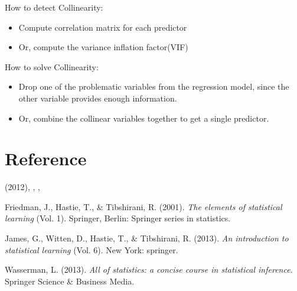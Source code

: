     \documentclass[12pt,fleqn,a4paper]{article}%
\theoremstyle{definition}
\theoremstyle{plain}
\numberwithin{equation}{section}
\begin{document}
How to detect Collinearity:
\begin{itemize}
\item Compute correlation matrix for each predictor
\item Or, compute the variance inflation factor(VIF)
\end{itemize}

How to solve Collinearity:
\begin{itemize}
\item Drop one of the problematic variables from the regression model, since the other variable provides enough information.
\item Or, combine the collinear variables together to get a single predictor.
\end{itemize}

\section*{Reference}
\noindent
\begin{description}\itemsep=-2pt
\item {\MbQ{}} (2012), {\MaQ{}}{\MbQ{}}, {\McQ{}}, {\MkQ{}}
\item Friedman, J., Hastie, T., \& Tibshirani, R. (2001). {\it{The elements of statistical learning}} (Vol. 1). Springer, Berlin: Springer series in statistics.
\item James, G., Witten, D., Hastie, T., \& Tibshirani, R. (2013). {\it{An introduction to statistical learning}} (Vol. 6). New York: springer.
\item Wasserman, L. (2013). {\it{All of statistics: a concise course in statistical inference}}. Springer Science \& Business Media.
\end{description}
\end{document}
